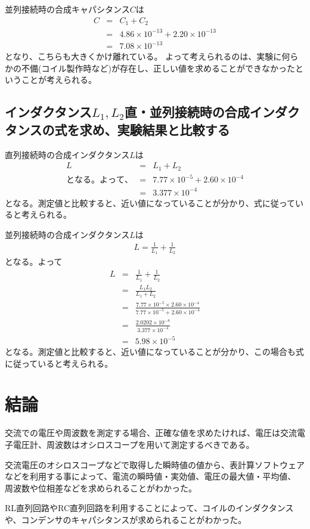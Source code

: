 \documentclass[dvipdfmx]{jsarticle}
\begin{document}
並列接続時の合成キャパシタンス$C$は
\begin{eqnarray*}
  C & = & C_1 + C_2\\
  & = & 4.86 \times 10^{-13} + 2.20 \times 10^{-13}\\
  & = & 7.08 \times 10^{-13}
\end{eqnarray*}
となり、こちらも大きくかけ離れている。
よって考えられるのは、実験に何らかの不備(コイル製作時など)が存在し、正しい値を求めることができなかったということが考えられる。

\subsection{インダクタンス$L_1, L_2$直・並列接続時の合成インダクタンスの式を求め、実験結果と比較する}
直列接続時の合成インダクタンス$L$は
\begin{eqnarray*}
  L & = & L_1 + L_2\\
  となる。よって、
  & = & 7.77\times10^{-5} + 2.60 \times 10^{-4}\\
  & = & 3.377\times10^{-4}
\end{eqnarray*}
となる。測定値と比較すると、近い値になっていることが分かり、式に従っていると考えられる。

並列接続時の合成インダクタンス$L$は
\begin{eqnarray*}
  L = \frac{1}{L_1} + \frac{1}{L_2}
\end{eqnarray*}
となる。よって
\begin{eqnarray*}
  L& = &\frac{1}{L_1} + \frac{1}{L_2}\\
  & = &\frac{L_1L_2}{L_1 + L_2}\\
  & = & \frac{7.77\times10^{-5} \times 2.60 \times 10^{-4}}{7.77\times10^{-5} + 2.60 \times 10^{-4}}\\
  & = & \frac{2.0202\times10^{-8}}{3.377\times10^{-4}}\\
  & = & 5.98\times10^{-5}
\end{eqnarray*}
となる。測定値と比較すると、近い値になっていることが分かり、この場合も式に従っていると考えられる。

\section{結論}
交流での電圧や周波数を測定する場合、正確な値を求めたければ、電圧は交流電子電圧計、周波数はオシロスコープを用いて測定するべきである。

交流電圧のオシロスコープなどで取得した瞬時値の値から、表計算ソフトウェアなどを利用する事によって、電流の瞬時値・実効値、電圧の最大値・平均値、
周波数や位相差などを求められることがわかった。

RL直列回路やRC直列回路を利用することによって、コイルのインダクタンスや、コンデンサのキャパシタンスが求められることがわかった。
\end{document}
